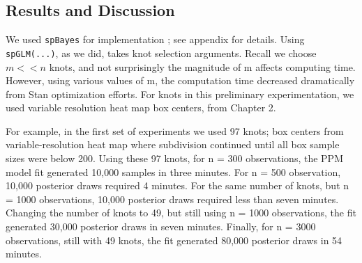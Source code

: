 
\subsection{Results and Discussion}

We used \verb|spBayes| for implementation \citep{Finley2013}; see appendix for details. Using \verb|spGLM(...)|, as we did, takes knot selection arguments. Recall we choose $m < < n$ knots, and not surprisingly the magnitude of m affects computing time. However, using various values of m, the computation time decreased dramatically from Stan optimization efforts. For knots in this preliminary experimentation, we used variable resolution heat map box centers, from Chapter 2.

For example, in the first set of experiments we used 97 knots; box centers from variable-resolution heat map where subdivision continued until all box sample sizes were below 200. Using these 97 knots, for n = 300 observations, the PPM model fit generated 10,000 samples in three minutes. For n = 500 observation, 10,000 posterior draws required 4 minutes. For the same number of knots, but n = 1000 observations, 10,000 posterior draws required less than seven minutes. Changing the number of knots to 49, but still using n = 1000 observations, the fit generated 30,000 posterior draws in seven minutes. Finally, for n = 3000 observations, still with 49 knots, the fit generated 80,000 posterior draws in 54 minutes.


